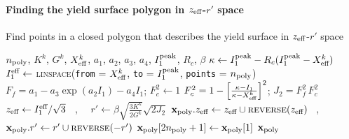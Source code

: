 \paragraph{Finding the yield surface polygon in $z_{\text{eff}}$-$r'$ space}
\begin{breakablealgorithm}
\caption{Find points in a closed polygon that describes the yield surface in $z_{\text{eff}}$-$r'$ space}
\begin{algorithmic}[1]
  \Require $n_{\text{poly}}$, $K^k$, $G^k$, $X_{\text{eff}}^k$, $a_1$, $a_2$, $a_3$, $a_4$, $I_1^{\text{peak}}$, $R_c$, $\beta$
    \State $\kappa \leftarrow I_1^{\text{peak}} - R_c (I_1^{\text{peak}} - X_{\text{eff}}^k)$
    \State $I_1^{\text{eff}} \leftarrow$ \textsc{linspace}(\texttt{from} = $X_{\text{eff}}^k$, 
      \texttt{to} = $I_1^{\text{peak}}$, \texttt{points} = $n_{\text{poly}}$)  \WRP
      \State $F_f = a_1 - a_3 \exp(a_2 I_1) - a_4 I_1$;
      \State $F_c^2 \leftarrow 1$
        \State $F_c^2 = 1 - \left[\frac{\kappa - I_1}{\kappa - X_{\text{eff}}^k}\right]^2$;
      \EndIf
      \State $J_2 = F_f^2 \,F_c^2$
    \EndFor
    \State $z_{\text{eff}} \leftarrow I_1^{\text{eff}}/\sqrt{3}$ ~,~~ 
           $r' \leftarrow \beta \sqrt{\frac{3K^k}{2G^k}} \sqrt{2J_2}$
    \State $\mathbf{x}_{\text{poly}}.z_{\text{eff}} \leftarrow z_{\text{eff}} \cup \textsc{reverse}(z_{\text{eff}})$ ~,~~
           $\mathbf{x}_{\text{poly}}.r' \leftarrow r' \cup \textsc{reverse}(-r')$ \WRP
    \State $\mathbf{x}_{\text{poly}}[2n_{\text{poly}}+1] \leftarrow \mathbf{x}_{\text{poly}}[1]$
    \State \Return $\mathbf{x}_{\text{poly}}$
  \EndProcedure
\end{algorithmic}
\end{breakablealgorithm}


